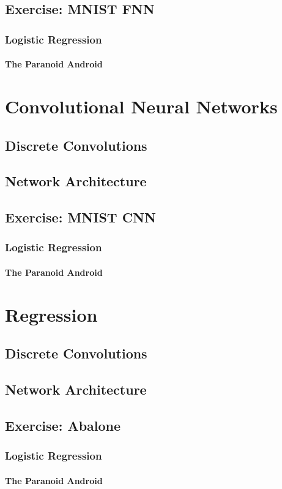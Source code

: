 \documentclass[aspectratio=169]{beamer}
\begin{document}
\subsection{Exercise: MNIST FNN}

\begin{frame}
\frametitle{Logistic Regression}
\framesubtitle{The Paranoid Android}
\end{frame}

\section{Convolutional Neural Networks}

\subsection{Discrete Convolutions}
\subsection{Network Architecture}
\subsection{Exercise: MNIST CNN}

\begin{frame}
\frametitle{Logistic Regression}
\framesubtitle{The Paranoid Android}
\end{frame}

\section{Regression}

\subsection{Discrete Convolutions}
\subsection{Network Architecture}
\subsection{Exercise: Abalone}

\begin{frame}
\frametitle{Logistic Regression}
\framesubtitle{The Paranoid Android}
\end{frame}
\end{document}
